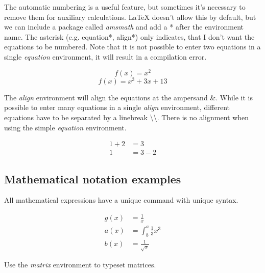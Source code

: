 \documentclass[11pt]{article}  %
\begin{document}
      The automatic numbering is a useful feature, but sometimes it's necessary to remove them for auxiliary calculations. LaTeX doesn't allow this by default, but we can include a package called \textit{amsmath} and add a * after the environment name. The asterisk (e.g. equation*, align*) only indicates, that I don't want the equations to be numbered. Note that it is not possible to enter two equations in a single \textit{equation} environment, it will result in a compilation error.

      \begin{equation}  %
        f(x) = x^2
      \end{equation}
      \begin{equation*}
        f(x) = x^3 + 3x + 13
      \end{equation*}

      The \textit{align} environment will align the equations at the ampersand \&. While it is possible to enter many equations in a single \textit{align} environment, different equations have to be separated by a linebreak \textbackslash \textbackslash. There is no alignment when using the simple \textit{equation} environment.

      \begin{align*}
        1 + 2 &= 3\\
        1 &= 3 - 2
      \end{align*}

    \subsection{Mathematical notation examples}
      All mathematical expressions have a unique command with unique syntax.

      \begin{align*}
        g(x) &= \frac{1}{x}\\              %
        a(x) &= \int^a_b \frac{1}{3}x^3\\  %
        b(x) &= \frac{1}{\sqrt{x}}         %
      \end{align*}

      Use the \textit{matrix} environment to typeset matrices. \left[\begin{matrix}1 & 0\\0 & 1\end{matrix}\right]
\end{document}
